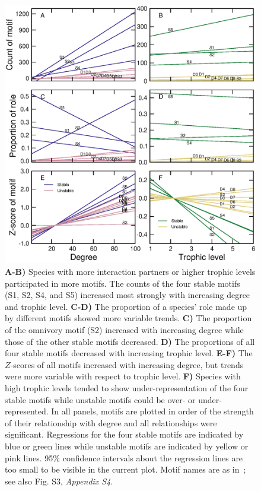 \documentclass[12pt]{article}
\begin{document}
            \begin{figure}[h!]
            \caption{\textbf{A-B)} Species with more interaction partners or higher trophic levels  participated in more motifs. The counts of the four stable motifs (S1, S2, S4, and S5) increased most strongly with increasing degree and trophic level. \textbf{C-D)} The proportion of a species' role made up by different motifs showed more variable trends.
            \textbf{C)} The proportion of the omnivory motif (S2) increased with increasing degree while those of the other stable motifs decreased. \textbf{D)} The proportions of all four stable motifs  decreased with increasing trophic level.
            \textbf{E-F)} The $Z$-scores of all motifs increased with increasing degree, but trends were more variable with respect to trophic level. \textbf{F)} Species with high trophic levels tended to show under-representation of the four stable motifs while unstable motifs could be over- or under-represented. In all panels, motifs are plotted in order of the strength of their relationship with degree and all relationships were significant. Regressions for the four stable motifs are indicated by blue or green lines while unstable motifs are indicated by yellow or pink lines. 95\% confidence intervals about the regression lines are too small to be visible in the current plot. Motif names are as in~\citet{Stouffer2007}; see also Fig. S3, \emph{Appendix S4}.}
                \label{motif_vs_degTL}
                \includegraphics[height=.65\textheight]{figures/roles/motif_vs_oneD.eps}
                \end{figure}
\end{document}
